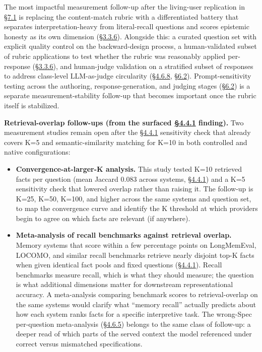 The most impactful measurement follow-up after the living-user
replication in \hyperref[subject-and-corpus-expansion]{§7.1} is replacing the content-match rubric with a
differentiated battery that separates interpretation-heavy from
literal-recall questions and scores epistemic honesty as its own
dimension (\hyperref[rubric-handling-limitations-post-hoc-validity-audit]{§3.3.6}). Alongside this: a curated question set with explicit
quality control on the backward-design process, a human-validated subset
of rubric applications to test whether the rubric was reasonably applied
per-response (\hyperref[rubric-handling-limitations-post-hoc-validity-audit]{§3.3.6}), and human-judge validation on a stratified subset
of responses to address class-level LLM-as-judge circularity (\hyperref[class-level-llm-dependence-the-limitation-no-robustness-check-resolves]{§4.6.8},
\hyperref[measurement-apparatus]{§6.2}). Prompt-sensitivity testing across the authoring,
response-generation, and judging stages (\hyperref[measurement-apparatus]{§6.2}) is a separate
measurement-stability follow-up that becomes important once the rubric
itself is stabilized.

\textbf{Retrieval-overlap follow-ups (from the surfaced \hyperref[cross-system-retrieval-providers-do-not-converge]{§4.4.1}
finding).} Two measurement studies remain open after the \hyperref[cross-system-retrieval-providers-do-not-converge]{§4.4.1}
sensitivity check that already covers K=5 and semantic-similarity
matching for K=10 in both controlled and native configurations:

\begin{itemize}
\item
  \textbf{Convergence-at-larger-K analysis.} This study tested K=10
  retrieved facts per question (mean Jaccard 0.083 across systems,
  \hyperref[cross-system-retrieval-providers-do-not-converge]{§4.4.1}) and a K=5 sensitivity check that lowered overlap rather than
  raising it. The follow-up is K=25, K=50, K=100, and higher across the
  same systems and question set, to map the convergence curve and
  identify the K threshold at which providers begin to agree on which
  facts are relevant (if anywhere).
\item
  \textbf{Meta-analysis of recall benchmarks against retrieval overlap.}
  Memory systems that score within a few percentage points on
  LongMemEval, LOCOMO, and similar recall benchmarks retrieve nearly
  disjoint top-K facts when given identical fact pools and fixed
  questions (\hyperref[cross-system-retrieval-providers-do-not-converge]{§4.4.1}). Recall benchmarks measure recall, which is what
  they should measure; the question is what additional dimensions matter
  for downstream representational accuracy. A meta-analysis comparing
  benchmark scores to retrieval-overlap on the same systems would
  clarify what ``memory recall'' actually predicts about how each system
  ranks facts for a specific interpretive task. The wrong-Spec
  per-question meta-analysis (\hyperref[wrong-spec-derangement-protocol-sensitivity]{§4.6.5}) belongs to the same class of
  follow-up: a deeper read of which parts of the served context the
  model referenced under correct versus mismatched specifications.
\end{itemize}

